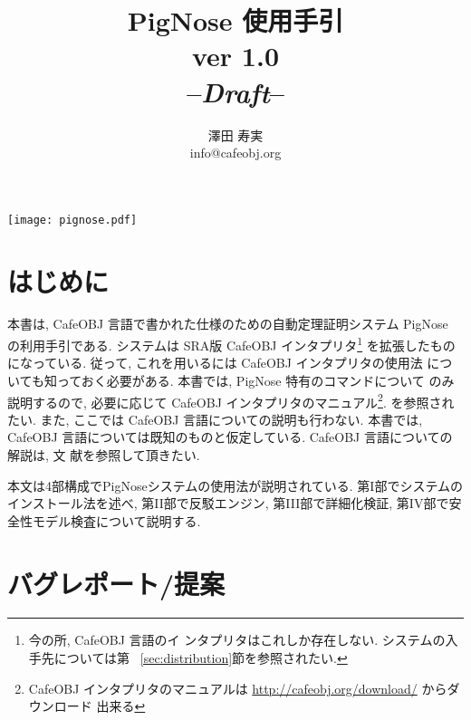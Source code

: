 \documentclass[a4paper,oneside]{memoir}
\begin{document}
\tightlists
\midsloppy
\raggedbottom
{}
\frontmatter
\pagestyle{empty}
\title{\textbf{PigNose 使用手引}\\ver 1.0 \\ --\textit{Draft}--}
\author{澤田 寿実\\
  info@cafeobj.org}
\date{}
\maketitle
  \begin{center}
    \texttt{[image: pignose.pdf]}
  \end{center}
\thispagestyle{empty}
\newpage
\section*{はじめに}
本書は, CafeOBJ 言語で書かれた仕様のための自動定理証明システム
PigNose の利用手引である. 
システムは SRA版 CafeOBJ インタプリタ\footnote{今の所, CafeOBJ 言語のイ
  ンタプリタはこれしか存在しない. システムの入手先については第
  ~\ref{sec:distribution}節を参照されたい.} 
を拡張したものになっている. 
従って, これを用いるには CafeOBJ インタプリタの使用法
についても知っておく必要がある. 本書では, PigNose 特有のコマンドについて
のみ説明するので, 必要に応じて CafeOBJ インタプリタのマニュアル\footnote{CafeOBJ インタプリタのマニュアルは
   \url{http://cafeobj.org/download/} からダウンロード
   出来る}. 
を参照されたい.
また, ここでは CafeOBJ 言語についての説明も行わない. 本書では, CafeOBJ
言語については既知のものと仮定している. CafeOBJ 言語についての解説は, 文
献\cite{CafeRep}を参照して頂きたい. 


本文は4部構成でPigNoseシステムの使用法が説明されている.
第I部でシステムのインストール法を述べ, 第II部で反駁エンジン,
第III部で詳細化検証, 第IV部で安全性モデル検査について説明する.

\section*{バグレポート/提案}
\end{document}
